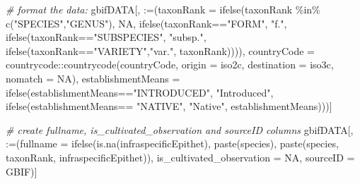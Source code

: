 \documentclass[
]{article}
\newenvironment{Shaded}{\begin{snugshade}}{\end{snugshade}}
\newcommand{\AttributeTok}[1]{\textcolor[rgb]{0.77,0.63,0.00}{#1}}
\newcommand{\CommentTok}[1]{\textcolor[rgb]{0.56,0.35,0.01}{\textit{#1}}}
\newcommand{\ConstantTok}[1]{\textcolor[rgb]{0.00,0.00,0.00}{#1}}
\newcommand{\FunctionTok}[1]{\textcolor[rgb]{0.00,0.00,0.00}{#1}}
\newcommand{\NormalTok}[1]{#1}
\newcommand{\SpecialCharTok}[1]{\textcolor[rgb]{0.00,0.00,0.00}{#1}}
\newcommand{\StringTok}[1]{\textcolor[rgb]{0.31,0.60,0.02}{#1}}
\begin{document}
\begin{Shaded}
\begin{Highlighting}[]
\CommentTok{\# format the data:}
\NormalTok{gbifDATA[, }\StringTok{\textasciigrave{}}\AttributeTok{:=}\StringTok{\textasciigrave{}}\NormalTok{(}\AttributeTok{taxonRank =} \FunctionTok{ifelse}\NormalTok{(taxonRank }\SpecialCharTok{\%in\%} \FunctionTok{c}\NormalTok{(}\StringTok{"SPECIES"}\NormalTok{,}\StringTok{"GENUS"}\NormalTok{),}
                                   \ConstantTok{NA}\NormalTok{,}
                                   \FunctionTok{ifelse}\NormalTok{(taxonRank}\SpecialCharTok{==}\StringTok{"FORM"}\NormalTok{, }\StringTok{"f."}\NormalTok{,}
                                          \FunctionTok{ifelse}\NormalTok{(taxonRank}\SpecialCharTok{==}\StringTok{"SUBSPECIES"}\NormalTok{, }\StringTok{"subsp."}\NormalTok{,}
                                                 \FunctionTok{ifelse}\NormalTok{(taxonRank}\SpecialCharTok{==}\StringTok{"VARIETY"}\NormalTok{,}\StringTok{"var."}\NormalTok{,}
\NormalTok{                                                        taxonRank)))),}
                    \AttributeTok{countryCode =}\NormalTok{ countrycode}\SpecialCharTok{::}\FunctionTok{countrycode}\NormalTok{(countryCode,}
                                                           \AttributeTok{origin =}  \StringTok{\textquotesingle{}iso2c\textquotesingle{}}\NormalTok{,}
                                                           \AttributeTok{destination =} \StringTok{\textquotesingle{}iso3c\textquotesingle{}}\NormalTok{,}
                                                           \AttributeTok{nomatch =} \ConstantTok{NA}\NormalTok{),}
                    \AttributeTok{establishmentMeans =} \FunctionTok{ifelse}\NormalTok{(establishmentMeans}\SpecialCharTok{==}\StringTok{"INTRODUCED"}\NormalTok{,}
                                                \StringTok{"Introduced"}\NormalTok{,}
                                                \FunctionTok{ifelse}\NormalTok{(establishmentMeans}\SpecialCharTok{==} \StringTok{"NATIVE"}\NormalTok{,}
                                                       \StringTok{"Native"}\NormalTok{,}
\NormalTok{                                                       establishmentMeans)))]}

\CommentTok{\# create \textquotesingle{}fullname\textquotesingle{}, \textquotesingle{}is\_cultivated\_observation\textquotesingle{} and \textquotesingle{}sourceID\textquotesingle{} columns}
\NormalTok{gbifDATA[, }\StringTok{\textasciigrave{}}\AttributeTok{:=}\StringTok{\textasciigrave{}}\NormalTok{(}\AttributeTok{fullname =} \FunctionTok{ifelse}\NormalTok{(}\FunctionTok{is.na}\NormalTok{(infraspecificEpithet),}
                                  \FunctionTok{paste}\NormalTok{(species),}
                                  \FunctionTok{paste}\NormalTok{(species, taxonRank, infraspecificEpithet)),}
                \AttributeTok{is\_cultivated\_observation =} \ConstantTok{NA}\NormalTok{,}
                \AttributeTok{sourceID =} \StringTok{\textquotesingle{}GBIF\textquotesingle{}}\NormalTok{)]}


\end{Highlighting}
\end{Shaded}
\end{document}
